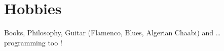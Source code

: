 \section{Hobbies}
 \resumeSubHeadingListStart
 \renewcommand{\labelitemi}{-}
 \setlength{\itemindent}{-15pt}
 \item{Books, Philosophy, Guitar (Flamenco, Blues, Algerian Chaabi) and … programming too !}
 \resumeSubHeadingListEnd